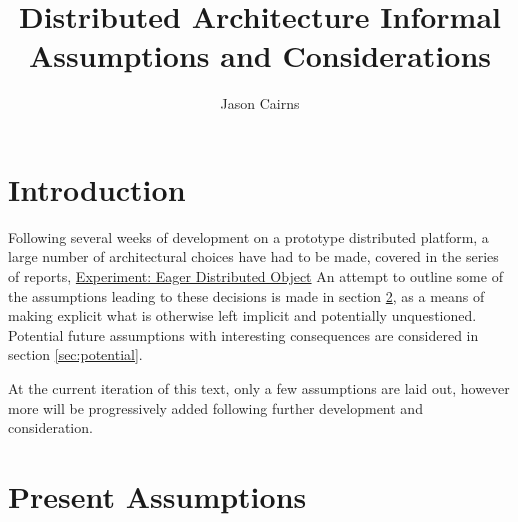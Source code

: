 \documentclass[10pt, a4paper]{article}
\begin{document}
\title{Distributed Architecture Informal Assumptions and Considerations}
\author{Jason Cairns}
  
\maketitle

\section{Introduction}
Following several weeks of development on a prototype distributed platform, a
large number of architectural choices have had to be made, covered in the
series of reports, \href{experiment-eager-dist-obj-supp.pdf}{Experiment: Eager
Distributed Object}
An attempt to outline some of the assumptions leading to these decisions is
made in section \ref{sec:assumptions}, as a means of making explicit what is
otherwise left implicit and potentially unquestioned.
Potential future assumptions with interesting consequences are considered in
section \ref{sec:potential}.

At the current iteration of this text, only a few assumptions are laid out,
however more will be progressively added following further development and
consideration.

\section{Present Assumptions}\label{sec:assumptions}
\end{document}
